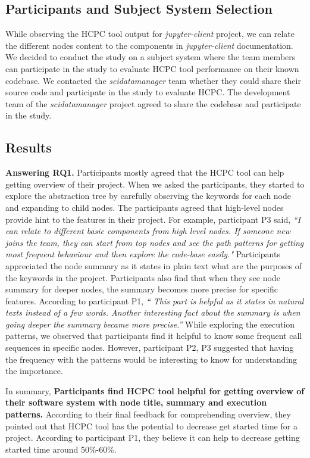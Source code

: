 \subsection{Participants and Subject System Selection}
While observing the HCPC tool output for \emph{jupyter-client} project, we can relate the different nodes content to the components in \emph{jupyter-client} documentation. We decided to conduct the study on a subject system where the team members can participate in the study to evaluate HCPC tool performance on their known codebase. We contacted the \emph{scidatamanager} team whether they could share their source code and participate in the study to evaluate HCPC. The development team of the \emph{scidatamanager} project agreed to share the codebase and participate in the study. 
\subsection{Results}
\textbf{Answering RQ1.} Participants mostly agreed that the HCPC tool can help getting overview of their project. When we asked the participants, they started to explore the abstraction tree by carefully observing the keywords for each node and expanding to child nodes. The participants agreed that high-level nodes provide hint to the features in their project. For example, participant P3 said, \emph{``I can relate to different basic components from high level nodes. If someone new joins the team, they can start from top nodes and see the path patterns for getting most frequent behaviour and then explore the code-base easily."} Participants appreciated the node summary as it states in plain text what are the purposes of the keywords in the project. Participants also find that when they see node summary for deeper nodes, the summary becomes more precise for specific features. 
According to participant P1, \emph{`` This part is helpful as it states in natural texts instead of a few words. Another interesting fact about the summary is when going deeper the summary became more precise.''} While exploring the execution patterns, we observed that participants find it helpful to know some frequent call sequences in specific nodes. However, participant P2, P3 suggested that having the frequency with the patterns would be interesting to know for understanding the importance. 

In summary, \textbf{Participants find HCPC tool helpful for getting overview of their software system with node title, summary and execution patterns.} According to their final feedback for comprehending overview, they pointed out that HCPC tool has the potential to decrease get started time for a project. According to participant P1, they believe  it can help to decrease getting started time around 50\%-60\%.

